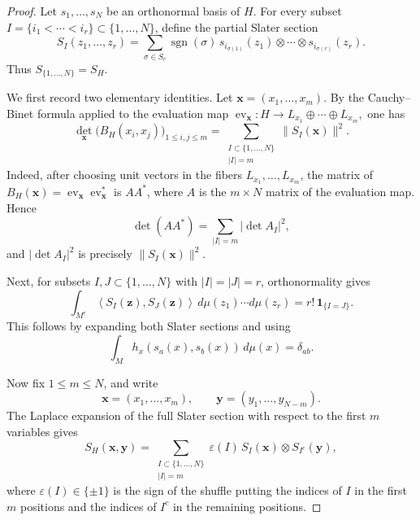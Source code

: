 \documentclass[10pt,a4paper]{amsart}
\def\leq{\leqslant}
\begin{document}
\begin{proof}
Let $s_1,\ldots,s_N$ be an orthonormal basis of $H$. For every subset $I=\{i_1<\cdots<i_r\}\subset\{1,\ldots,N\}$, define the partial Slater section
\[
S_I(z_1,\ldots,z_r)
=
\sum_{\sigma\in S_r}
\operatorname{sgn}(\sigma)\,
s_{i_{\sigma(1)}}(z_1)\otimes\cdots\otimes s_{i_{\sigma(r)}}(z_r).
\]
Thus $S_{\{1,\ldots,N\}}=S_H$.

We first record two elementary identities. Let $\mathbf x=(x_1,\ldots,x_m)$. By the Cauchy--Binet formula applied to the evaluation map $\operatorname{ev}_{\mathbf x}:H\longrightarrow
L_{x_1}\oplus\cdots\oplus L_{x_m},$ one has
\begin{equation}\label{eq:32}
\det_{\mathbf x}\bigl(B_H(x_i,x_j)\bigr)_{1\leq i,j\leq m}
=
\sum_{\substack{I\subset\{1,\ldots,N\}\\ |I|=m}}
\|S_I(\mathbf x)\|^2.
\end{equation}
Indeed, after choosing unit vectors in the fibers $L_{x_1},\ldots,L_{x_m}$, the matrix of $B_H(\mathbf x)=\operatorname{ev}_{\mathbf x}\operatorname{ev}_{\mathbf x}^*$ is $AA^*$, where $A$ is the $m\times N$ matrix of the evaluation map. Hence
\[
\det(AA^*)
=
\sum_{|I|=m} |\det A_I|^2,
\]
and $|\det A_I|^2$ is precisely $\|S_I(\mathbf x)\|^2$.

Next, for subsets $I,J\subset\{1,\ldots,N\}$ with $|I|=|J|=r$, orthonormality gives
\begin{equation}\label{eq:33}
\int_{M^r}
\left\langle
S_I(\mathbf z),S_J(\mathbf z)
\right\rangle
\,d\mu(z_1)\cdots d\mu(z_r)
=
r!\,\mathbf 1_{\{I=J\}}.
\end{equation}
This follows by expanding both Slater sections and using
\[
\int_M h_x(s_a(x),s_b(x))\,d\mu(x)=\delta_{ab}.
\]

Now fix $1\leq m\leq N$, and write
\[
\mathbf x=(x_1,\ldots,x_m),
\qquad
\mathbf y=(y_1,\ldots,y_{N-m}).
\]
The Laplace expansion of the full Slater section with respect to the first $m$ variables gives
\[
S_H(\mathbf x,\mathbf y)
=
\sum_{\substack{I\subset\{1,\ldots,N\}\\ |I|=m}}
\varepsilon(I)\,
S_I(\mathbf x)\otimes S_{I^c}(\mathbf y),
\]
where $\varepsilon(I)\in\{\pm1\}$ is the sign of the shuffle putting the indices of $I$ in the first $m$ positions and the indices of $I^c$ in the remaining positions.


\end{proof}
\end{document}

